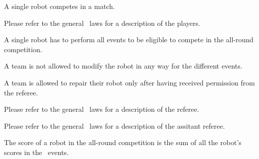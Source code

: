 \documentclass[12pt]{hurocup}
\begin{document}

\begin{lawlist}[ALR]
 \item A single robot competes in a match.
\end{lawlist}


Please refer to the general \HuroCup\ laws for a description of
the players.

\begin{lawlist}[ALR]
  
\item A single robot has to perform all events to be eligible to
 compete in the all-round competition.
  
\item A team is not allowed to modify the robot in any way for the
 different events.

\item A team is allowed to repair their robot only after having
 received permission from the referee.
  
\end{lawlist}


Please refer to the general \HuroCup\ laws for a description of
the referee.


Please refer to the general \HuroCup\ laws for a description of
the assitant referee.


\begin{lawlist}[ALR]

\item The score of a robot in the all-round competition is the sum of
 all the robot's scores in the \HuroCup\ events.

\end{lawlist}

\end{document}

